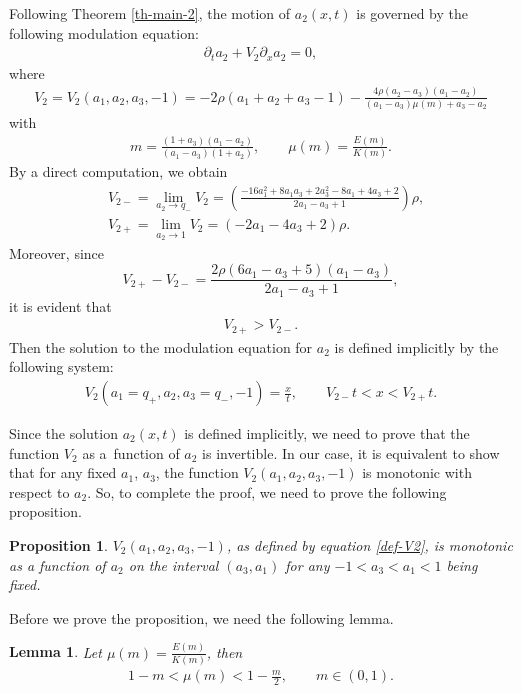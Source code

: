 \documentclass[pdftex]{sigma}
\numberwithin{equation}{section}
\newtheorem{Lemma}[Theorem]{Lemma}
\newtheorem{Proposition}[Theorem]{Proposition}
\def\ra{\rightarrow}
\begin{document}
Following Theorem \ref{th-main-2}, the motion of $a_2(x,t)$ is governed by the following modulation equation:
\begin{align*}
\partial_t a_2+V_2\partial_x a_2=0,
\end{align*}
where
\begin{align}
V_2 =V_2(a_1,a_2,a_3,-1)=-2\rho(a_1+a_2+a_3-1)-\frac{4\rho(a_2-a_3)(a_1-a_2)}{(a_1-a_3)\mu(m) +a_3-a_2}\label{def-V2}
\end{align}
with
\begin{align*}
m=\frac{(1+a_3)(a_1-a_2)}{(a_1-a_3)(1+a_2)},\qquad
\mu(m)=\frac{E(m)}{K(m)}.
\end{align*}
By a direct computation, we obtain
\begin{align*}
&V_{2-}=\lim_{a_2\ra q_-}V_2=\left(\frac{-16a_1^2+8a_1a_3+2a_3^2-8a_1+4a_3+2}{2a_1-a_3+1}\right)\rho,\\
&V_{2+}=\lim_{a_2\ra 1}V_2=(-2a_1-4a_3+2)\rho.
\end{align*}
Moreover, since \[V_{2+}-V_{2-}=\frac{2\rho(6a_1-a_3+5)(a_1-a_3)}{2a_1-a_3+1},\] it is evident that
\begin{align*}
V_{2+}>V_{2-}.
\end{align*}
Then the solution to the modulation equation for $a_2$ is defined implicitly by the following system:
\begin{align}
V_2(a_1=q_+,a_2,a_3=q_-,-1)=\frac{x}{t},\qquad V_{2-}t<x<V_{2+}t.\label{eq: implic-a2}
\end{align}

Since the solution $a_2(x,t)$ is defined implicitly, we need to prove that the function $V_2$ as a~function of $a_2$ is invertible. In our case, it is equivalent to show that for any fixed $a_1$, $a_3$, the function $V_2(a_1,a_2,a_3,-1)$ is monotonic with respect to $a_2$. So, to complete the proof, we need to prove the following proposition.

\begin{Proposition}\label{mono-V2}
$V_2(a_1,a_2,a_3,-1)$, as defined by equation \eqref{def-V2}, is monotonic as a function of $a_2$ on the interval $(a_3,a_1)$ for any $-1<a_3<a_1<1$ being fixed.
\end{Proposition}

Before we prove the proposition, we need the following lemma.
\begin{Lemma}\label{Lemma-mu-ineq}
Let $\mu(m)=\frac{E(m)}{K(m)}$, then
\begin{align}\label{mu-ineq}
1-m<\mu(m)<1-\frac{m}{2},\qquad m\in (0,1).
\end{align}
\end{Lemma}
\end{document}
